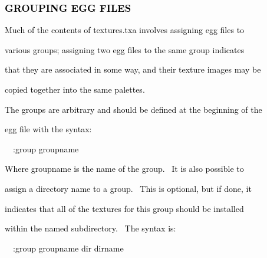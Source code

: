 \documentclass[a4paper]{article}
\newcommand\textstyleOOoComputerKeyWord[1]{\textrm{\textcolor[rgb]{0.0,0.0,0.5019608}{#1}}}
\begin{document}
\bigskip


\bigskip

\subsubsection[GROUPING EGG FILES]{\textstyleOOoComputerKeyWord{\textcolor{black}{GROUPING EGG FILES}}}
\hypertarget{RefHeading7662869075401}{}
\bigskip

{\color{black}
\textstyleOOoComputerKeyWord{\textcolor{black}{Much of the contents of textures.txa involves assigning egg files to}}}

{\color{black}
\textstyleOOoComputerKeyWord{\textcolor{black}{various groups; assigning two egg files to the same group indicates}}}

{\color{black}
\textstyleOOoComputerKeyWord{\textcolor{black}{that they are associated in some way, and their texture images may be}}}

{\color{black}
\textstyleOOoComputerKeyWord{\textcolor{black}{copied together into the same palettes.}}}


\bigskip

\clearpage
\bigskip

{\color{black}
\textstyleOOoComputerKeyWord{\textcolor{black}{The groups are arbitrary and should be defined at the beginning of the}}}

{\color{black}
\textstyleOOoComputerKeyWord{\textcolor{black}{egg file with the syntax:}}}


\bigskip

{\color{black}
\textstyleOOoComputerKeyWord{\textcolor{black}{\ \ :group groupname}}}


\bigskip

{\color{black}
\textstyleOOoComputerKeyWord{\textcolor{black}{Where groupname is the name of the group. \ It is also possible to}}}

{\color{black}
\textstyleOOoComputerKeyWord{\textcolor{black}{assign a directory name to a group. \ This is optional, but if done,
it}}}

{\color{black}
\textstyleOOoComputerKeyWord{\textcolor{black}{indicates that all of the textures for this group should be installed}}}

{\color{black}
\textstyleOOoComputerKeyWord{\textcolor{black}{within the named subdirectory. \ The syntax is:}}}


\bigskip

{\color{black}
\textstyleOOoComputerKeyWord{\textcolor{black}{\ \ :group groupname dir dirname}}}
\end{document}

